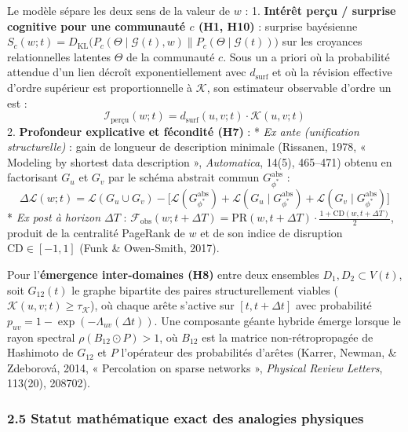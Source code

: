 \documentclass[a4paper,11pt]{article}
\begin{document}
Le modèle sépare les deux sens de la valeur de \(w\) : 1.
\textbf{Intérêt perçu / surprise cognitive pour une communauté \(c\)
(H1, H10)} : surprise bayésienne
\(S_c(w; t) = D_{\text{KL}}\big(P_c(\Theta \mid \mathcal{G}(t), w) \parallel P_c(\Theta \mid \mathcal{G}(t))\big)\)
sur les croyances relationnelles latentes \(\Theta\) de la communauté
\(c\). Sous un a priori où la probabilité attendue d'un lien décroît
exponentiellement avec \(d_{\text{surf}}\) et où la révision effective
d'ordre supérieur est proportionnelle à \(\mathcal{K}\), son estimateur
observable d'ordre un est :
\[\mathcal{I}_{\text{perçu}}(w; t) = d_{\text{surf}}(u, v; t) \cdot \mathcal{K}(u, v; t)\]
2. \textbf{Profondeur explicative et fécondité (H7)} : * \emph{Ex ante
(unification structurelle)} : gain de longueur de description minimale
(Rissanen, 1978, « Modeling by shortest data description »,
\emph{Automatica}, 14(5), 465--471) obtenu en factorisant \(G_u\) et
\(G_v\) par le schéma abstrait commun \(G_{\phi^*}^{\text{abs}}\) :
\[\Delta \mathcal{L}(w; t) = \mathcal{L}(G_u \cup G_v) - \big[\mathcal{L}(G_{\phi^*}^{\text{abs}}) + \mathcal{L}(G_u \mid G_{\phi^*}^{\text{abs}}) + \mathcal{L}(G_v \mid G_{\phi^*}^{\text{abs}})\big]\]
* \emph{Ex post à horizon \(\Delta T\)} :
\(\mathcal{F}_{\text{obs}}(w; t+\Delta T) = \text{PR}(w, t+\Delta T) \cdot \frac{1 + \text{CD}(w, t+\Delta T)}{2}\),
produit de la centralité PageRank de \(w\) et de son indice de
disruption \(\text{CD} \in [-1, 1]\) (Funk \& Owen-Smith, 2017).

Pour l'\textbf{émergence inter-domaines (H8)} entre deux ensembles
\(D_1, D_2 \subset V(t)\), soit \(G_{12}(t)\) le graphe bipartite des
paires structurellement viables
(\(\mathcal{K}(u,v;t) \ge \tau_{\mathcal{K}}\)), où chaque arête
s'active sur \([t, t+\Delta t]\) avec probabilité
\(p_{uv} = 1 - \exp(-\Lambda_{uv}(\Delta t))\). Une composante géante
hybride émerge lorsque le rayon spectral \(\rho(B_{12} \odot P) > 1\),
où \(B_{12}\) est la matrice non-rétropropagée de Hashimoto de
\(G_{12}\) et \(P\) l'opérateur des probabilités d'arêtes (Karrer,
Newman, \& Zdeborová, 2014, « Percolation on sparse networks »,
\emph{Physical Review Letters}, 113(20), 208702).

\subsubsection*{2.5 Statut mathématique exact des analogies physiques}
\end{document}
